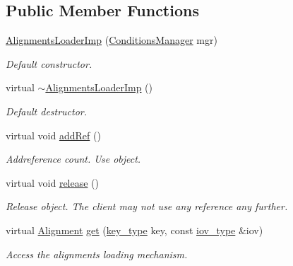 \subsection*{Public Member Functions}
\begin{DoxyCompactItemize}
\item 
\hyperlink{class_d_d4hep_1_1_conditions_1_1_alignments_loader_imp_a82c0f304132e15093e9e2a7a74e33f00}{AlignmentsLoaderImp} (\hyperlink{class_d_d4hep_1_1_conditions_1_1_conditions_manager}{ConditionsManager} mgr)
\begin{DoxyCompactList}\small\item\em Default constructor. \item\end{DoxyCompactList}\item 
virtual \hyperlink{class_d_d4hep_1_1_conditions_1_1_alignments_loader_imp_a6d54425e5976b7e45f5e99722fcbbbff}{$\sim$AlignmentsLoaderImp} ()
\begin{DoxyCompactList}\small\item\em Default destructor. \item\end{DoxyCompactList}\item 
virtual void \hyperlink{class_d_d4hep_1_1_conditions_1_1_alignments_loader_imp_ac4797b3da6e5543cf505eca8bf9cb405}{addRef} ()
\begin{DoxyCompactList}\small\item\em Addreference count. Use object. \item\end{DoxyCompactList}\item 
virtual void \hyperlink{class_d_d4hep_1_1_conditions_1_1_alignments_loader_imp_aa9cf749689a76b853f7d7e543f84b761}{release} ()
\begin{DoxyCompactList}\small\item\em Release object. The client may not use any reference any further. \item\end{DoxyCompactList}\item 
virtual \hyperlink{class_d_d4hep_1_1_alignments_1_1_alignment}{Alignment} \hyperlink{class_d_d4hep_1_1_conditions_1_1_alignments_loader_imp_af6db86883e1ab8af6940e3260369228d}{get} (\hyperlink{class_d_d4hep_1_1_alignments_1_1_alignments_loader_af56e6294e72dacbe001c1f24b8381d5d}{key\_\-type} key, const \hyperlink{class_d_d4hep_1_1_i_o_v}{iov\_\-type} \&iov)
\begin{DoxyCompactList}\small\item\em Access the alignments loading mechanism. \item\end{DoxyCompactList}\item 

\end{DoxyCompactItemize}
